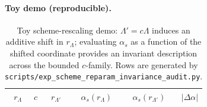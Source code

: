 \paragraph{Toy demo (reproducible).}
\AuditTag %
\begin{table}[t]
\centering
\small
\setlength{\tabcolsep}{8pt}
\renewcommand{\arraystretch}{1.15}
\begin{tabular}{rrrrrr}
\toprule
$r_\Lambda$ & $c$ & $r_{\Lambda'}$ & $\alpha_s(r_\Lambda)$ & $\alpha_s(r_{\Lambda'})$ & $|\Delta\alpha|$ \\
\midrule
%
\end{tabular}
\caption{Toy scheme-rescaling demo: $\Lambda' = c\Lambda$ induces an additive shift in $r_\Lambda$; evaluating $\alpha_s$ as a function of the shifted coordinate provides an invariant description across the bounded $c$-family. Rows are generated by \texttt{scripts/exp\_scheme\_reparam\_invariance\_audit.py}.}
\label{tab:scheme_invariance_demo}
\end{table}
